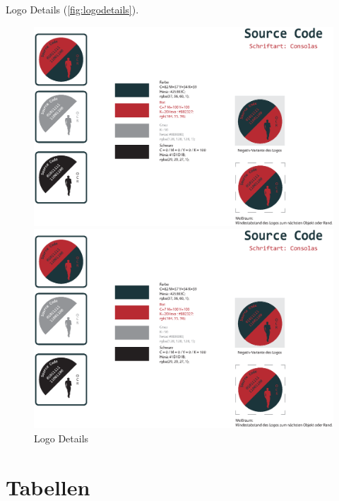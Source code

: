 Logo Details (\autoref{fig:logodetails}).
\begin{figure}[!h]%
	\centering
	\begin{minipage}[b]{0.49\textwidth}
		\includegraphics[width=\textwidth]{content/beispiele/images/Logo-Details.eps}
	\end{minipage}
	\hfill
	\begin{minipage}[b]{0.49\textwidth}
		\includegraphics[width=\textwidth]{content/beispiele/images/Logo-Details.eps}
	\end{minipage}
	\caption{Logo Details}\label{fig:logodetails}%
\end{figure}

\section{Tabellen}
\label{sec:tabellen}

